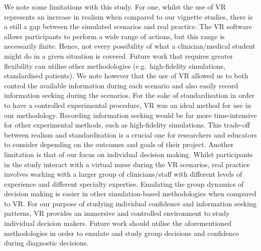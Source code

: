 \documentclass[a4paper, nobind]{templates/ociamthesis}
\begin{document}
We note some limitations with this study. For one, whilst the use of VR represents an increase in realism when compared to our vignette studies, there is a still a gap between the simulated scenarios and real practice. The VR software allows participants to perform a wide range of actions, but this range is necessarily finite. Hence, not every possibility of what a clinician/medical student might do in a given situation is covered. Future work that requires greater flexibility can utilise other methodologies (e.g.~high-fidelity simulations, standardised patients). We note however that the use of VR allowed us to both control the available information during each scenario and also easily record information seeking during the scenarios. For the sake of standardisation in order to have a controlled experimental procedure, VR was an ideal method for use in our methodology. Recording information seeking would be far more time-intensive for other experimental methods, such as high-fidelity simulations. This trade-off between realism and standardisation is a crucial one for researchers and educators to consider depending on the outcomes and goals of their project. Another limitation is that of our focus on individual decision making. Whilst participants in the study interact with a virtual nurse during the VR scenarios, real practice involves working with a larger group of clinicians/staff with different levels of experience and different specialty expertise. Emulating the group dynamics of decision making is easier in other simulation-based methodologies when compared to VR. For our purpose of studying individual confidence and information seeking patterns, VR provides an immersive and controlled environment to study individual decision makers. Future work should utilise the aforementioned methodologies in order to emulate and study group decisions and confidence during diagnostic decisions.
\end{document}

